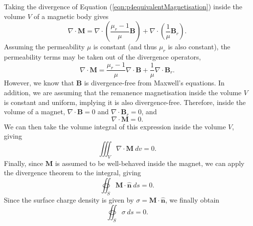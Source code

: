 Taking the divergence of Equation (\ref{eqn:p4equivalentMagnetisation}) inside the volume \(V\) of a magnetic body gives
\begin{equation}
    \nabla \cdot \mathbf{M} = \nabla \cdot \left( \frac{\mu_r-1}{\mu} \mathbf{B} \right) + \nabla \cdot \left( \frac{1}{\mu} \mathbf{B}_r \right) \text{.}
\end{equation}
Assuming the permeability \(\mu\) is constant (and thus \(\mu_r\) is also constant), the permeability terms may be taken out of the divergence operators,
\begin{equation}
    \nabla \cdot \mathbf{M} = \frac{\mu_r-1}{\mu} \nabla \cdot \mathbf{B} + \frac{1}{\mu} \nabla \cdot \mathbf{B}_r \text{.}
\end{equation}
However, we know that \(\mathbf{B}\) is divergence-free from Maxwell's equations. In addition, we are assuming that the remanence magnetisation inside the volume \(V\) is constant and uniform, implying it is also divergence-free. Therefore, inside the volume of a magnet, \(\nabla \cdot \mathbf{B} = 0\) and \(\nabla \cdot \mathbf{B}_r = 0\), and
\begin{equation}
    \nabla \cdot \mathbf{M} = 0 \text{.}
\end{equation}
We can then take the volume integral of this expression inside the volume \(V\), giving
\begin{equation}
    \iiint_V \nabla \cdot \mathbf{M}\ dv = 0 \text{.}
\end{equation}
Finally, since \(\mathbf{M}\) is assumed to be well-behaved inside the magnet, we can apply the divergence theorem to the integral, giving
\begin{equation}
    \oiint_S \mathbf{M} \cdot \hat{\mathbf{n}}\ ds = 0 \text{.}
\end{equation}
Since the surface charge density is given by \(\sigma = \mathbf{M} \cdot \hat{\mathbf{n}}\), we finally obtain
\begin{equation}\label{eqn:p4integralSigma}
    \oiint_S \sigma \ ds = 0 \text{.}
\end{equation}